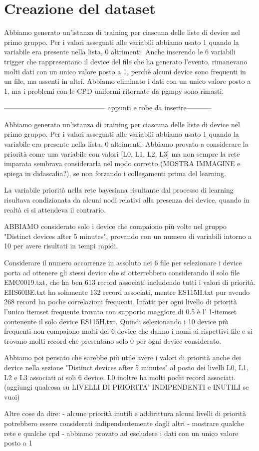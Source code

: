 \documentclass[a4paper]{article}
\begin{document}
\section*{Creazione del dataset}
Abbiamo generato un'istanza di training per ciascuna delle liste di device nel primo gruppo. Per i valori assegnati alle variabili abbiamo usato 1 quando la variabile era presente nella lista, 0 altrimenti. Anche inserendo le 6 variabili trigger che rappresentano il device del file che ha generato l'evento, rimanevano molti dati con un unico valore posto a 1, perchè alcuni device sono frequenti in un file, ma assenti in altri. Abbiamo eliminato i dati con un unico valore posto a 1, ma i problemi con le CPD uniformi ritornate da pgmpy sono rimasti.



-------------------------------------------- appunti e robe da inserire-----------

Abbiamo generato un'istanza di training per ciascuna delle liste di device nel primo gruppo. Per i valori assegnati alle variabili abbiamo usato 1 quando la variabile era presente nella lista, 0 altrimenti. Abbiamo provato a considerare la priorità come una variabile con valori [L0, L1, L2, L3] ma non sempre la rete imparata sembrava considerarla nel modo corretto (MOSTRA IMMAGINE e spiega in didascalia?), se non forzando i collegamenti prima del learning.

La variabile priorità nella rete bayesiana risultante dal processo di learning risultava condizionata da alcuni nodi relativi alla presenza dei device, quando in realtà ci si attendeva il contrario.

ABBIAMO considerato solo i device che compaiono più volte nel gruppo "Distinct devices after 5 minutes", provando con un numero
di variabili intorno a 10 per avere risultati in tempi rapidi. 

Considerare il numero occorrenze in assoluto nei 6 file per selezionare i device porta ad ottenere gli stessi device che si otterrebbero considerando il solo file EMC0019.txt, che ha ben 613 record associati includendo tutti i valori di priorità.
EHS60BE.txt ha solamente 132 record associati, mentre ES115H.txt pur avendo 268 record ha poche correlazioni frequenti. 
Infatti per ogni livello di priorità l'unico itemset frequente trovato con supporto maggiore di 0.5 è l' 1-itemset contenente il solo device
ES115H.txt. Quindi selezionando i 10 device più frequenti non compaiono molti dei 6 device che danno i nomi ai rispettivi file e
si trovano molti record che presentano solo 0 per ogni device considerato. 


Abbiamo poi pensato che sarebbe più utile avere i valori di priorità anche dei device nella sezione "Distinct devices after 5 minutes"
al posto dei livelli L0, L1, L2 e L3 associati ai soli 6 device. L0 inoltre ha molti pochi record associati.(aggiungi qualcosa su LIVELLI DI PRIORITA' INDIPENDENTI e INUTILI se vuoi)





Altre cose da dire:
- alcune priorità inutili e addirittura alcuni livelli di priorità potrebbero essere considerati indipendentemente dagli altri
- mostrare qualche rete e qualche cpd
- abbiamo provato ad escludere i dati con un unico valore posto a 1
\end{document}
